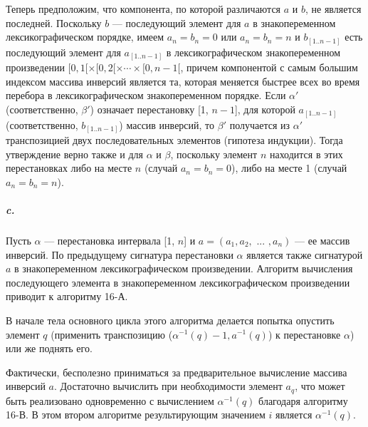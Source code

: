 \documentclass{../../template/mai_book}
\begin{document}
Теперь предположим, что компонента, по которой различаются $a$ и $b$, не является последней. Поскольку $b$ — последующий элемент для $a$ в знакопеременном лексикографическом порядке, имеем $a_n = b_n = 0$ или $a_n = b_n = n$ и $b_{[1..n - 1]}$ есть последующий элемент для $a_{[1..n - 1]}$ в лексикографическом знакопеременном произведении $[0, 1[ \times [0, 2[ \times \cdots \times [0, n - 1[$, причем компонентой с самым большим индексом массива инверсий является та, которая меняется быстрее всех во время перебора в лексикографическом знакопеременном порядке. Если $\alpha'$ (соответственно, $\beta'$) означает перестановку [1, $n - 1$], для которой $a_{[1..n - 1]}$ (соответственно, $b_{[1..n - 1]}$) массив инверсий, то $\beta'$ получается из $\alpha'$ транспозицией двух последовательных элементов (гипотеза индукции). Тогда утверждение верно также и для $\alpha$ и $\beta$, поскольку элемент $n$ находится в этих перестановках либо на месте $n$ (случай $a_n = b_n = 0$), либо на месте 1 (случай $a_n = b_n = n$).

\subparagraph{c.} Пусть $\alpha$ — перестановка интервала [1, $n$] и $a = (a_1, a_2, \text{ ... }, a_n)$ — ее массив инверсий. По предыдущему сигнатура перестановки $\alpha$ является также сигнатурой $a$ в знакопеременном лексикографическом произведении. Алгоритм вычисления последующего элемента в знакопеременном лексикографическом произведении приводит к алгоритму 16-А.

В начале тела основного цикла этого алгоритма делается попытка опустить элемент $q$ (применить транспозицию ($\alpha^{-1}(q) - 1, a^{-1}(q)$) к перестановке $\alpha$) или же поднять его.

\newpage


Фактически, бесполезно приниматься за предварительное вычисление массива инверсий $a$. Достаточно вычислить при необходимости элемент $a_q$, что может быть реализовано одновременно с вычислением $\alpha^{-1}(q)$ благодаря алгоритму 16-В. В этом втором алгоритме результирующим значением $i$ является $\alpha^{-1}(q)$.
\end{document}
